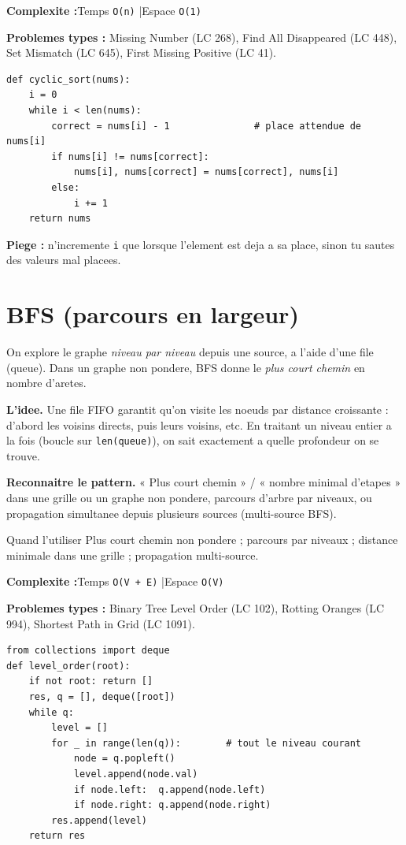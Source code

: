 \documentclass[11pt,a4paper]{article}
\newcommand{\complexite}[2]{%
  \noindent\textbf{Complexite :}\quad Temps \texttt{#1} \quad|\quad Espace \texttt{#2}\par\smallskip}
\newcommand{\leetcode}[1]{\noindent\textbf{Problemes types :} #1\par\medskip}
\begin{document}
\complexite{O(n)}{O(1)}
\leetcode{Missing Number (LC 268), Find All Disappeared (LC 448), Set Mismatch (LC 645), First Missing Positive (LC 41).}

\begin{lstlisting}
def cyclic_sort(nums):
    i = 0
    while i < len(nums):
        correct = nums[i] - 1               # place attendue de nums[i]
        if nums[i] != nums[correct]:
            nums[i], nums[correct] = nums[correct], nums[i]
        else:
            i += 1
    return nums
\end{lstlisting}

\textbf{Piege :} n'incremente \texttt{i} que lorsque l'element est deja a sa place,
sinon tu sautes des valeurs mal placees.

\section{BFS (parcours en largeur)}
On explore le graphe \emph{niveau par niveau} depuis une source, a l'aide d'une
file (queue). Dans un graphe non pondere, BFS donne le \emph{plus court chemin} en
nombre d'aretes.

\textbf{L'idee.} Une file FIFO garantit qu'on visite les noeuds par distance
croissante : d'abord les voisins directs, puis leurs voisins, etc. En traitant un
niveau entier a la fois (boucle sur \texttt{len(queue)}), on sait exactement a
quelle profondeur on se trouve.

\textbf{Reconnaitre le pattern.} « Plus court chemin » / « nombre minimal
d'etapes » dans une grille ou un graphe non pondere, parcours d'arbre par niveaux,
ou propagation simultanee depuis plusieurs sources (multi-source BFS).

\begin{infobox}{Quand l'utiliser}
Plus court chemin non pondere ; parcours par niveaux ; distance minimale dans une
grille ; propagation multi-source.
\end{infobox}

\complexite{O(V + E)}{O(V)}
\leetcode{Binary Tree Level Order (LC 102), Rotting Oranges (LC 994), Shortest Path in Grid (LC 1091).}

\begin{lstlisting}
from collections import deque
def level_order(root):
    if not root: return []
    res, q = [], deque([root])
    while q:
        level = []
        for _ in range(len(q)):        # tout le niveau courant
            node = q.popleft()
            level.append(node.val)
            if node.left:  q.append(node.left)
            if node.right: q.append(node.right)
        res.append(level)
    return res
\end{lstlisting}
\end{document}
